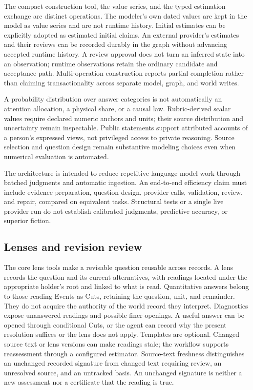 \documentclass[11pt,a4paper]{article}
\begin{document}
The compact construction tool, the value series, and the typed estimation
exchange are distinct operations. The modeler's own dated values are kept in the
model as value series and are not runtime history. Initial estimates can be
explicitly adopted as estimated initial claims. An external provider's estimates
and their reviews can be recorded durably in the graph without advancing
accepted runtime history. A review approval does
not turn an inferred state into an observation; runtime observations retain the
ordinary candidate and acceptance path. Multi-operation construction reports
partial completion rather than claiming transactionality across separate model,
graph, and world writes.

A probability distribution over answer categories is not automatically an
attention allocation, a physical share, or a causal law. Rubric-derived scalar
values require declared numeric anchors and units; their source distribution
and uncertainty remain inspectable. Public statements support attributed
accounts of a person's expressed views, not privileged access to private
reasoning. Source selection and question design remain substantive modeling
choices even when numerical evaluation is automated.

The architecture is intended to reduce repetitive language-model work through
batched judgments and automatic ingestion. An end-to-end efficiency claim must
include evidence preparation, question design, provider calls, validation,
review, and repair, compared on equivalent tasks. Structural tests or a single
live provider run do not establish
calibrated judgments, predictive accuracy, or superior fiction.

\subsection{Lenses and revision review}
\label{sec:lenses}

The core lens tools make a revisable question reusable across records. A lens
records the question and its current alternatives, with readings located under
the appropriate holder's root and linked to what is read. Quantitative answers
belong to those reading Events as Cuts, retaining the question, unit, and
remainder. They do not acquire the authority of the world record they interpret.
Diagnostics expose unanswered readings and possible finer openings. A useful
answer can be opened through conditional Cuts, or the agent can record why the
present resolution suffices or the lens does not apply. Templates are optional.
Changed source text or lens versions can make readings stale; the workflow
supports reassessment through a configured estimator.
Source-text freshness distinguishes an unchanged recorded signature from
changed text requiring review, an unresolved source, and an untracked basis.
An unchanged signature is neither a new assessment nor a
certificate that the reading is true.
\end{document}
